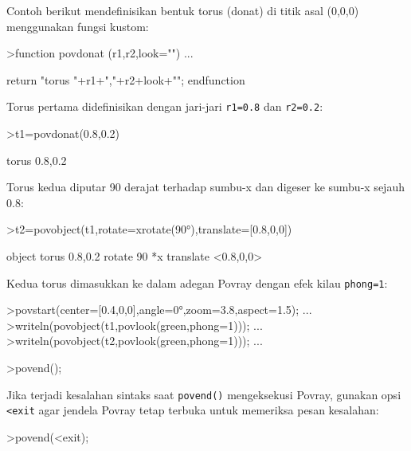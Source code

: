 \documentclass[a4paper,11pt,oneside,enabledeprecatedfontcommands]{scrbook}
\newenvironment{eulernotebook}{}{}
\newenvironment{eulercomment}{\par\medskip\noindent}{\par\medskip}
\begin{document}
\begin{eulernotebook}
\begin{eulercomment}
Contoh berikut mendefinisikan bentuk torus (donat) di titik asal (0,0,0) menggunakan
fungsi kustom:
\end{eulercomment}
\begin{eulerprompt}
>function povdonat (r1,r2,look="") ...
\end{eulerprompt}
\begin{eulerudf}
return "torus {"+r1+","+r2+look+"}";
endfunction
\end{eulerudf}
\begin{eulercomment}
Torus pertama didefinisikan dengan jari-jari \texttt{r1=0.8} dan \texttt{r2=0.2}:
\end{eulercomment}
\begin{eulerprompt}
>t1=povdonat(0.8,0.2)
\end{eulerprompt}
\begin{euleroutput}
torus {0.8,0.2}
\end{euleroutput}
\begin{eulercomment}
Torus kedua diputar 90 derajat terhadap sumbu-x dan digeser ke sumbu-x sejauh 0.8:
\end{eulercomment}
\begin{eulerprompt}
>t2=povobject(t1,rotate=xrotate(90°),translate=[0.8,0,0])
\end{eulerprompt}
\begin{euleroutput}
object { torus {0.8,0.2}
    rotate 90 *x 
    translate <0.8,0,0>
}
\end{euleroutput}
\begin{eulercomment}
Kedua torus dimasukkan ke dalam adegan Povray dengan efek kilau \texttt{phong=1}:
\end{eulercomment}
\begin{eulerprompt}
>povstart(center=[0.4,0,0],angle=0°,zoom=3.8,aspect=1.5); ...
>writeln(povobject(t1,povlook(green,phong=1))); ...
>writeln(povobject(t2,povlook(green,phong=1))); ...
\end{eulerprompt}
\begin{eulerttcomment}
>povend();
\end{eulerttcomment}
\begin{eulercomment}
Jika terjadi kesalahan sintaks saat \texttt{povend()} mengeksekusi Povray, gunakan opsi \texttt{<exit}
agar jendela Povray tetap terbuka untuk memeriksa pesan kesalahan:
\end{eulercomment}
\begin{eulerttcomment}
>povend(<exit);
\end{eulerttcomment}
\begin{eulercomment}

\end{eulercomment}
\end{eulernotebook}
\end{document}
